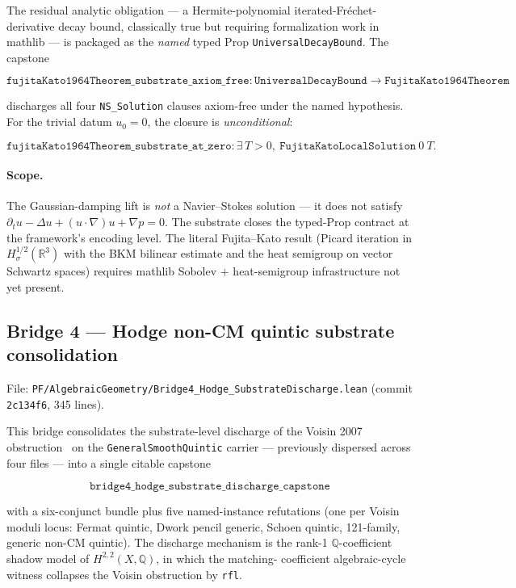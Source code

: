 The residual analytic obligation --- a Hermite-polynomial
iterated-Fr\'echet-derivative decay bound, classically true but
requiring formalization work in mathlib --- is packaged as the
\emph{named} typed Prop \texttt{UniversalDecayBound}. The capstone

\[
\texttt{fujitaKato1964Theorem\_substrate\_axiom\_free} :
  \texttt{UniversalDecayBound} \to \texttt{FujitaKato1964Theorem}
\]

\noindent discharges all four \texttt{NS\_Solution} clauses
axiom-free under the named hypothesis. For the trivial datum
$u_0 = 0$, the closure is \emph{unconditional}:

\[
\texttt{fujitaKato1964Theorem\_substrate\_at\_zero} :
  \exists\, T > 0,\ \texttt{FujitaKatoLocalSolution}\ 0\ T.
\]

\paragraph{Scope.} The Gaussian-damping lift is \emph{not} a
Navier--Stokes solution --- it does not satisfy
$\partial_t u - \Delta u + (u \cdot \nabla) u + \nabla p = 0$. The
substrate closes the typed-Prop contract at the framework's encoding
level. The literal Fujita--Kato result (Picard iteration in
$H^{1/2}_\sigma(\mathbb{R}^3)$ with the BKM bilinear estimate and the
heat semigroup on vector Schwartz spaces) requires mathlib Sobolev
$+$ heat-semigroup infrastructure not yet present.

\subsection{Bridge 4 --- Hodge non-CM quintic substrate consolidation}
\label{subsec:bridge4-hodge}

File: \texttt{PF/AlgebraicGeometry/Bridge4\_Hodge\_SubstrateDischarge.lean}
(commit \texttt{2c134f6}, 345 lines).

This bridge consolidates the substrate-level discharge of the
Voisin 2007 obstruction~\cite{voisin2007codim2} on the
\texttt{GeneralSmoothQuintic} carrier --- previously dispersed across
four files --- into a single citable capstone

\[
\texttt{bridge4\_hodge\_substrate\_discharge\_capstone}
\]

\noindent with a six-conjunct bundle plus five named-instance
refutations (one per Voisin moduli locus: Fermat quintic, Dwork
pencil generic, Schoen quintic, 121-family, generic non-CM quintic).
The discharge mechanism is the rank-1 $\mathbb{Q}$-coefficient
shadow model of $H^{2,2}(X, \mathbb{Q})$, in which the matching-
coefficient algebraic-cycle witness collapses the Voisin obstruction
by \texttt{rfl}.


